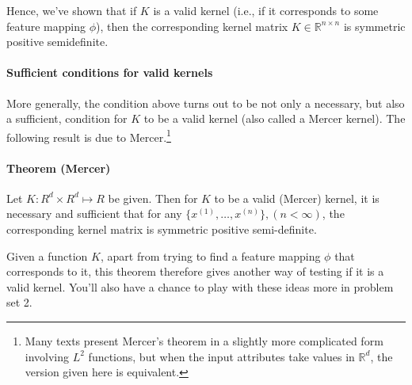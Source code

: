 Hence, we've shown that if $K$ is a valid kernel (i.e., if it corresponds to
some feature mapping $\phi$), then the corresponding kernel matrix $K \in \mathbb{R}^{n \times n}$
is symmetric positive semidefinite.

\paragraph{Sufficient conditions for valid kernels} More generally, the condition
above turns out to be not only a necessary, but also a sufficient, condition
for $K$ to be a valid kernel (also called a Mercer kernel). The following result
is due to Mercer.\footnote{
Many texts present Mercer's theorem in a slightly more complicated form involving
$L^2$ functions, but when the input attributes take values in $\mathbb R^d$, the version given here is
equivalent.}

\paragraph{Theorem (Mercer)} Let $K : R^d \times R^d \mapsto R$ be given. Then for $K$
to be a valid (Mercer) kernel, it is necessary and sufficient that for any
$\{x^{(1)} ,\ldots ,x^{(n)} \}, (n < \infty)$, the corresponding kernel matrix is symmetric positive
semi-definite.

Given a function $K$, apart from trying to find a feature mapping $\phi$ that
corresponds to it, this theorem therefore gives another way of testing if it is
a valid kernel. You'll also have a chance to play with these ideas more in
problem set 2.

